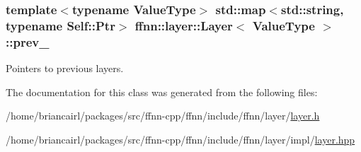 \hypertarget{classffnn_1_1layer_1_1_layer_abe139156722efe30288b00becbd52cb9}{
\subsubsection[{prev\-\_\-}]{\setlength{\rightskip}{0pt plus 5cm}template$<$typename Value\-Type$>$ std\-::map$<$std\-::string, typename {\bf Self\-::\-Ptr}$>$ {\bf ffnn\-::layer\-::\-Layer}$<$ Value\-Type $>$\-::prev\-\_\-\hspace{0.3cm}{\ttfamily [protected]}}}\label{classffnn_1_1layer_1_1_layer_abe139156722efe30288b00becbd52cb9}


Pointers to previous layers. 



The documentation for this class was generated from the following files\-:\begin{DoxyCompactItemize}
\item 
/home/briancairl/packages/src/ffnn-\/cpp/ffnn/include/ffnn/layer/\hyperlink{layer_8h}{layer.\-h}\item 
/home/briancairl/packages/src/ffnn-\/cpp/ffnn/include/ffnn/layer/impl/\hyperlink{layer_8hpp}{layer.\-hpp}\end{DoxyCompactItemize}
